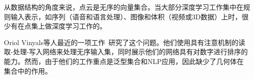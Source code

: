 从数据结构的角度来说，点云是无序的向量集合。当大部分深度学习工作集中在规则输入表示，如序列（语音和语言处理）、图像和体积（视频或3D数据）上时，很少有在点集上做深度学习工作的。

Oriol Vinyals等人最近的一项工作~\cite{vinyals2015order}研究了这个问题。他们使用具有注意机制的读取-处理-写入网络来处理无序输入集，同时展示他们的网络具有对数字进行排序的能力。然而，由于他们的工作重点是泛型集合和NLP应用，因此缺少了几何体在集合中的作用。

